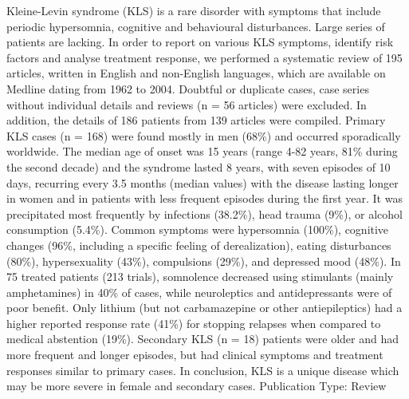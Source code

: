 \documentclass[a4paper, 10pt, english, final]{report}
\begin{document}
Kleine-Levin syndrome (KLS) is a rare disorder with symptoms that
include periodic hypersomnia, cognitive and behavioural
disturbances. Large series of patients are lacking. In order to report
on various KLS symptoms, identify risk factors and analyse treatment
response, we performed a systematic review of 195 articles, written in
English and non-English languages, which are available on Medline
dating from 1962 to 2004. Doubtful or duplicate cases, case series
without individual details and reviews (n = 56 articles) were
excluded. In addition, the details of 186 patients from 139 articles
were compiled. Primary KLS cases (n = 168) were found mostly in men
(68\%) and occurred sporadically worldwide. The median age of onset
was 15 years (range 4-82 years, 81\% during the second decade) and the
syndrome lasted 8 years, with seven episodes of 10 days, recurring
every 3.5 months (median values) with the disease lasting longer in
women and in patients with less frequent episodes during the first
year. It was precipitated most frequently by infections (38.2\%), head
trauma (9\%), or alcohol consumption (5.4\%). Common symptoms were
hypersomnia (100\%), cognitive changes (96\%, including a specific
feeling of derealization), eating disturbances (80\%), hypersexuality
(43\%), compulsions (29\%), and depressed mood (48\%). In 75 treated
patients (213 trials), somnolence decreased using stimulants (mainly
amphetamines) in 40\% of cases, while neuroleptics and antidepressants
were of poor benefit. Only lithium (but not carbamazepine or other
antiepileptics) had a higher reported response rate (41\%) for
stopping relapses when compared to medical abstention
(19\%). Secondary KLS (n = 18) patients were older and had more
frequent and longer episodes, but had clinical symptoms and treatment
responses similar to primary cases. In conclusion, KLS is a unique
disease which may be more severe in female and secondary cases.
Publication Type: Review
\end{document}
